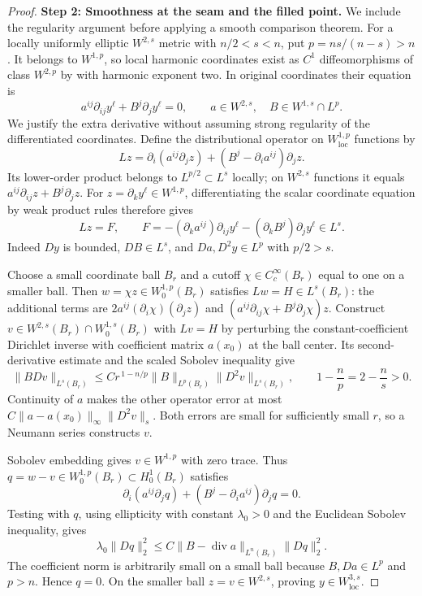 \begin{proof}
\smallskip\noindent
\textbf{Step 2: Smoothness at the seam and the filled point.}
We include the regularity argument before applying a smooth
comparison theorem.  For a locally uniformly elliptic
$W^{2,s}$ metric with $n/2<s<n$, put $p=ns/(n-s)>n$.
It belongs to $W^{1,p}$, so local harmonic coordinates exist as
$C^1$ diffeomorphisms of class $W^{2,p}$ by
\cite[Corollary~2.8]{JulinLiimatainenSalo2017} with harmonic exponent
two.  In original coordinates their equation is
\[
 a^{ij}\partial_{ij}y^\ell+B^j\partial_jy^\ell=0,
 \qquad a\in W^{2,s},\quad B\in W^{1,s}\cap L^p.
\]
We justify the extra derivative without assuming strong regularity
of the differentiated coordinates.  Define the distributional operator
on $W^{1,p}_{\mathrm{loc}}$ functions by
\[
 Lz=\partial_i(a^{ij}\partial_jz)
           +(B^j-\partial_i a^{ij})\partial_jz .
\]
Its lower-order product belongs to $L^{p/2}\subset L^s$ locally;
on $W^{2,s}$ functions it equals
$a^{ij}\partial_{ij}z+B^j\partial_jz$.
For $z=\partial_k y^\ell\in W^{1,p}$, differentiating the scalar
coordinate equation by weak product rules therefore gives
\[
 Lz=F,\qquad
 F=-(\partial_k a^{ij})\partial_{ij}y^\ell
            -(\partial_kB^j)\partial_jy^\ell\in L^s.
\]
Indeed $Dy$ is bounded, $DB\in L^s$, and
$Da,D^2y\in L^p$ with $p/2>s$.

Choose a small coordinate ball $B_r$ and a cutoff
$\chi\in C_c^\infty(B_r)$ equal to one on a smaller ball.
Then $w=\chi z\in W^{1,p}_0(B_r)$ satisfies $Lw=H\in L^s(B_r)$:
the additional terms are
$2a^{ij}(\partial_i\chi)(\partial_jz)$ and
$(a^{ij}\partial_{ij}\chi+B^j\partial_j\chi)z$.
Construct $v\in W^{2,s}(B_r)\cap W^{1,s}_0(B_r)$ with $Lv=H$
by perturbing the constant-coefficient Dirichlet inverse with
coefficient matrix $a(x_0)$ at the ball center.  Its
second-derivative estimate and the scaled Sobolev inequality give
\[
 \|B Dv\|_{L^s(B_r)}
 \le C r^{\,1-n/p}\|B\|_{L^p(B_r)}
                  \|D^2v\|_{L^s(B_r)},\qquad
 1-\frac np=2-\frac ns>0 .
\]
Continuity of $a$ makes the other operator error at most
$C\|a-a(x_0)\|_\infty\|D^2v\|_s$.  Both errors are small
for sufficiently small $r$, so a Neumann series constructs $v$.

Sobolev embedding gives $v\in W^{1,p}$ with zero trace.  Thus
$q=w-v\in W^{1,p}_0(B_r)\subset H^1_0(B_r)$ satisfies
\[
 \partial_i(a^{ij}\partial_jq)
          +(B^j-\partial_i a^{ij})\partial_jq=0 .
\]
Testing with $q$, using ellipticity with constant $\lambda_0>0$
and the Euclidean Sobolev inequality, gives
\[
 \lambda_0\|Dq\|_2^2
 \le C\|B-\operatorname{div}a\|_{L^n(B_r)}\|Dq\|_2^2 .
\]
The coefficient norm is arbitrarily small on a small ball because
$B,Da\in L^p$ and $p>n$.  Hence $q=0$.  On the smaller ball
$z=v\in W^{2,s}$, proving $y\in W^{3,s}_{\mathrm{loc}}$.


\end{proof}
